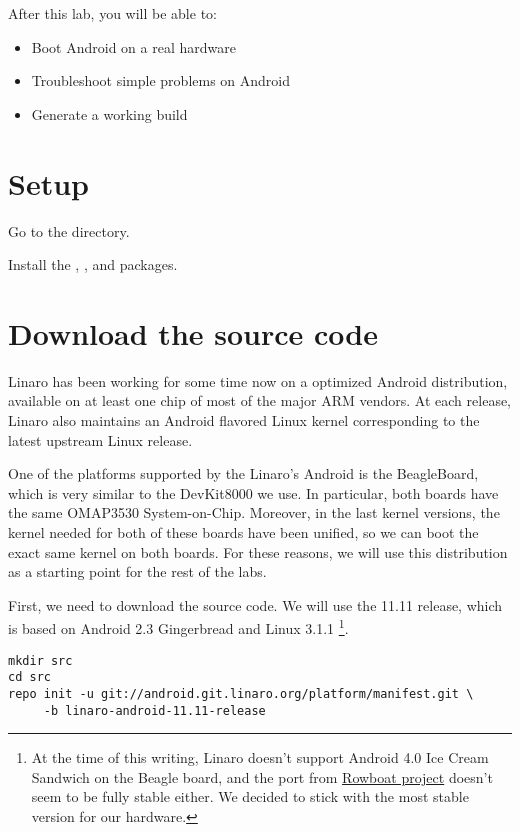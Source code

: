 
After this lab, you will be able to:
\begin{itemize}
  \item Boot Android on a real hardware
  \item Troubleshoot simple problems on Android
  \item Generate a working build
\end{itemize}

\section{Setup}

Go to the  directory.

Install the , , 
and  packages.

\section{Download the source code}

Linaro has been working for some time now on a optimized Android
distribution, available on at least one chip of most of the major ARM
vendors. At each release, Linaro also maintains an Android flavored
Linux kernel corresponding to the latest upstream Linux release.

One of the platforms supported by the Linaro's Android is the
BeagleBoard, which is very similar to the DevKit8000 we use. In
particular, both boards have the same OMAP3530 System-on-Chip.
Moreover, in the last kernel versions, the kernel needed for both of
these boards have been unified, so we can boot the exact same kernel
on both boards. For these reasons, we will use this distribution as a
starting point for the rest of the labs.

First, we need to download the source code. We will use the 11.11
release, which is based on Android 2.3 Gingerbread and Linux 3.1.1
\footnote{At the time of this writing, Linaro doesn't support Android
  4.0 Ice Cream Sandwich on the Beagle board, and the port from
  \href{http://code.google.com/p/rowboat} {Rowboat project} doesn't
  seem to be fully stable either. We decided to stick with the most
  stable version for our hardware.}.

\begin{verbatim}
mkdir src
cd src
repo init -u git://android.git.linaro.org/platform/manifest.git \
     -b linaro-android-11.11-release
\end{verbatim}

